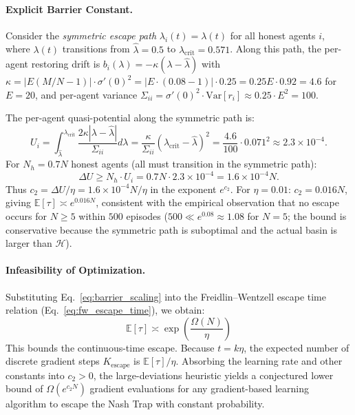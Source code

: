 \paragraph{Explicit Barrier Constant.}
Consider the \emph{symmetric escape path} $\lambda_i(t) = \lambda(t)$ for all honest agents $i$, where $\lambda(t)$ transitions from $\hat{\lambda} = 0.5$ to $\lambda_{\mathrm{crit}} = 0.571$. Along this path, the per-agent restoring drift is $b_i(\lambda) = -\kappa(\lambda - \hat{\lambda})$ with $\kappa = |E(M/N - 1)| \cdot \sigma'(0)^2 = |E \cdot (0.08 - 1)| \cdot 0.25 = 0.25E \cdot 0.92 = 4.6$ for $E = 20$, and per-agent variance $\Sigma_{ii} = \sigma'(0)^2 \cdot \mathrm{Var}[r_i] \approx 0.25 \cdot E^2 = 100$.

The per-agent quasi-potential along the symmetric path is:
\[
  U_i = \int_{\hat{\lambda}}^{\lambda_{\mathrm{crit}}} \frac{2\kappa|\lambda - \hat{\lambda}|}{\Sigma_{ii}} d\lambda
  = \frac{\kappa}{\Sigma_{ii}} (\lambda_{\mathrm{crit}} - \hat{\lambda})^2
  = \frac{4.6}{100} \cdot 0.071^2
  \approx 2.3 \times 10^{-4}.
\]
For $N_h = 0.7N$ honest agents (all must transition in the symmetric path):
\[
  \Delta U \geq N_h \cdot U_i = 0.7N \cdot 2.3 \times 10^{-4} = 1.6 \times 10^{-4} N.
\]
Thus $c_2 = \Delta U / \eta = 1.6 \times 10^{-4} N / \eta$ in the exponent $e^{c_2}$. For $\eta = 0.01$: $c_2 = 0.016 N$, giving $\mathbb{E}[\tau] \asymp e^{0.016 N}$, consistent with the empirical observation that no escape occurs for $N \geq 5$ within $500$ episodes ($500 \ll e^{0.08} \approx 1.08$ for $N=5$; the bound is conservative because the symmetric path is suboptimal and the actual basin is larger than $\mathcal{H}$).

\paragraph{Infeasibility of Optimization.}
Substituting Eq.~\ref{eq:barrier_scaling} into the Freidlin--Wentzell escape time relation (Eq.~\ref{eq:fw_escape_time}), we obtain:
\begin{equation}
\mathbb{E}[\tau] \asymp \exp\left( \frac{\Omega(N)}{\eta} \right)
\end{equation}
This bounds the continuous-time escape. Because $t = k\eta$, the expected number of discrete gradient steps $K_{\mathrm{escape}}$ is $\mathbb{E}[\tau] / \eta$. Absorbing the learning rate and other constants into $c_2 > 0$, the large-deviations heuristic yields a conjectured lower bound of $\Omega(e^{c_2 N})$ gradient evaluations for any gradient-based learning algorithm to escape the Nash Trap with constant probability.


